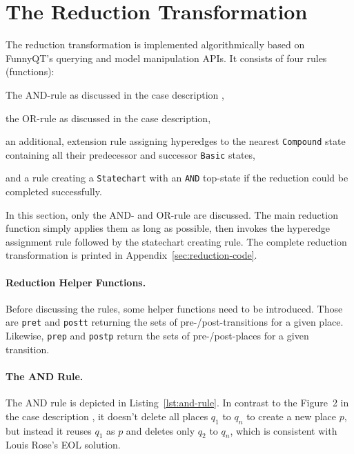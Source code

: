 \documentclass[submission]{eptcs}
\begin{document}
\section{The Reduction Transformation}
\label{sec:reduction-transformation}

The reduction transformation is implemented algorithmically based on FunnyQT's
querying and model manipulation APIs.  It consists of four rules (functions):
\begin{compactenum}
\item The AND-rule as discussed in the case description \cite{pn2sccasedesc},
\item the OR-rule as discussed in the case description,
\item an additional, extension rule assigning hyperedges to the nearest
  \verb|Compound| state containing all their predecessor and successor
  \verb|Basic| states,
\item and a rule creating a \verb|Statechart| with an \verb|AND| top-state if
  the reduction could be completed successfully.
\end{compactenum}

In this section, only the AND- and OR-rule are discussed.  The main reduction
function simply applies them as long as possible, then invokes the hyperedge
assignment rule followed by the statechart creating rule.  The complete
reduction transformation is printed in Appendix~\ref{sec:reduction-code}.

\paragraph{Reduction Helper Functions.}
\label{sec:reduct-help-functions}

Before discussing the rules, some helper functions need to be introduced.
Those are \verb|pret| and \verb|postt| returning the sets of
pre-/post-transitions for a given place.  Likewise, \verb|prep| and
\verb|postp| return the sets of pre-/post-places for a given transition.

\paragraph{The AND Rule.}
\label{sec:and-rule}

The AND rule is depicted in Listing~\ref{lst:and-rule}.  In contrast to the
Figure~2 in the case description \cite{pn2sccasedesc}, it doesn't delete all
places $q_1$ to $q_n$ to create a new place $p$, but instead it reuses $q_1$ as
$p$ and deletes only $q_2$ to $q_n$, which is consistent with Louis Rose's EOL
solution.
\end{document}
